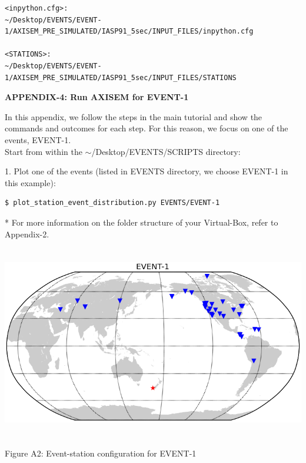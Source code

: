 \documentclass{article}
\begin{document}
\begin{verbatim}
<inpython.cfg>: 
~/Desktop/EVENTS/EVENT-1/AXISEM_PRE_SIMULATED/IASP91_5sec/INPUT_FILES/inpython.cfg

<STATIONS>:
~/Desktop/EVENTS/EVENT-1/AXISEM_PRE_SIMULATED/IASP91_5sec/INPUT_FILES/STATIONS
\end{verbatim}

\newpage

{\large{}\textbf{APPENDIX-4: Run AXISEM for EVENT-1}}

In this appendix, we follow the steps in the main tutorial and show the commands 
and outcomes for each step. For this reason, we focus on one of the events, EVENT-1. \\

Start from within the $\sim$/Desktop/EVENTS/SCRIPTS directory:

1. Plot one of the events (listed in EVENTS directory, we choose EVENT-1 in this example):
\begin{verbatim}
$ plot_station_event_distribution.py EVENTS/EVENT-1
\end{verbatim}
* For more information on the folder structure of your Virtual-Box, refer to Appendix-2.

\begin{center}
\includegraphics[width=444pt, height=240pt, keepaspectratio=true]{AXISEMTutorial-fig006.png}

{\small{}Figure A2: Event-station configuration for EVENT-1}
\end{center}
\end{document}
